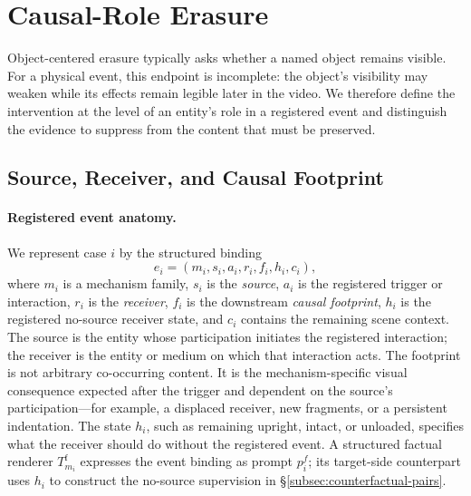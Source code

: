 \section{Causal-Role Erasure}
\label{sec:problem-formulation}

Object-centered erasure typically asks whether a named object remains visible.
For a physical event, this endpoint is incomplete: the object's visibility may
weaken while its effects remain legible later in the video. We therefore
define the intervention at the level of an entity's role in a registered event
and distinguish the evidence to suppress from the content that must be
preserved.

\subsection{Source, Receiver, and Causal Footprint}
\label{subsec:event-anatomy}

\paragraph{Registered event anatomy.}
We represent case $i$ by the structured binding
\begin{equation}
    e_i=(m_i,s_i,a_i,r_i,f_i,h_i,c_i),
    \label{eq:event-binding}
\end{equation}
where $m_i$ is a mechanism family, $s_i$ is the \emph{source}, $a_i$ is
the registered trigger or interaction, $r_i$ is the \emph{receiver}, $f_i$
is the downstream \emph{causal footprint}, $h_i$ is the registered no-source
receiver state, and $c_i$ contains the remaining scene context. The source is
the entity whose participation initiates the
registered interaction; the receiver is the entity or medium on which that
interaction acts. The footprint is not arbitrary co-occurring content. It is
the mechanism-specific visual consequence expected after the trigger and
dependent on the source's participation---for example, a displaced receiver,
new fragments, or a persistent indentation. The state \(h_i\), such as
remaining upright, intact, or unloaded, specifies what the receiver should do
without the registered event. A structured factual renderer
\(T_{m_i}^{\mathrm f}\) expresses the event binding as prompt \(p_i^{f}\);
its target-side counterpart uses \(h_i\) to construct the no-source supervision in
\S\ref{subsec:counterfactual-pairs}.

